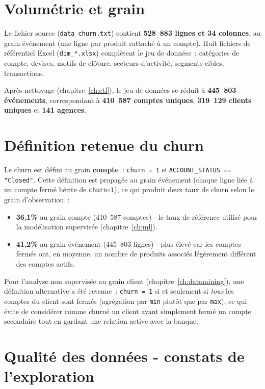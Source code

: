 \documentclass[11pt,a4paper]{report}
\begin{document}
\section{Volum\'etrie et grain}

Le fichier source (\texttt{data\_churn.txt}) contient \textbf{528~883 lignes et
34 colonnes}, au grain \'ev\'enement (une ligne par produit rattach\'e \`a un
compte). Huit fichiers de r\'ef\'erentiel Excel (\texttt{dim\_*.xlsx})
compl\`etent le jeu de donn\'ees~: cat\'egories de compte, devises, motifs de
cl\^oture, secteurs d'activit\'e, segments cibles, transactions.

Apr\`es nettoyage (chapitre~\ref{ch:etl}), le jeu de donn\'ees se r\'eduit \`a
\textbf{445~803 \'ev\'enements}, correspondant \`a \textbf{410~587 comptes
uniques}, \textbf{319~129 clients uniques} et \textbf{141 agences}.

\section{D\'efinition retenue du churn}

Le churn est d\'efini au grain \textbf{compte}~: \texttt{churn = 1} si
\texttt{ACCOUNT\_STATUS == "Closed"}. Cette d\'efinition est propag\'ee au grain
\'ev\'enement (chaque ligne li\'ee \`a un compte ferm\'e h\'erite de \texttt{churn=1}),
ce qui produit deux taux de churn selon le grain d'observation~:

\begin{itemize}
\item \textbf{36,1\%} au grain compte (410~587 comptes) - le taux de
      r\'ef\'erence utilis\'e pour la mod\'elisation supervis\'ee
      (chapitre~\ref{ch:ml}).
\item \textbf{41,2\%} au grain \'ev\'enement (445~803 lignes) - plus \'elev\'e
      car les comptes ferm\'es ont, en moyenne, un nombre de produits associ\'es
      l\'eg\`erement diff\'erent des comptes actifs.
\end{itemize}

Pour l'analyse non supervis\'ee au grain client (chapitre~\ref{ch:datamining}),
une d\'efinition alternative a \'et\'e retenue~: \texttt{churn = 1} si et
seulement si \emph{tous} les comptes du client sont ferm\'es (agr\'egation par
\texttt{min} plut\^ot que par \texttt{max}), ce qui \'evite de consid\'erer comme
churn\'e un client ayant simplement ferm\'e un compte secondaire tout en gardant
une relation active avec la banque.

\section{Qualit\'e des donn\'ees - constats de l'exploration}
\end{document}
